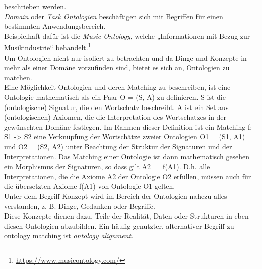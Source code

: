 beschrieben werden.\\
\textit{Domain} oder \textit{Task Ontologien} beschäftigen sich mit Begriffen
für einen bestimmten Anwendungsbereich. \cite{Bie02}  \cite{Hes02}\\
Beispielhaft dafür ist die \textit{Music Ontology}, welche „Informationen mit
Bezug zur Musikindustrie“
behandelt.\footnote{\url{https://www.musicontology.com/}}\\
Um Ontologien nicht nur isoliert zu betrachten und da Dinge und
Konzepte in mehr als einer Domäne vorzufinden sind, bietet es sich an,
Ontologien zu matchen.\\
Eine Möglichkeit Ontologien und deren Matching zu beschreiben, ist eine
Ontologie mathematisch als ein Paar O = (S, A) zu
definieren. S ist die (ontologische) Signatur, die den Wortschatz
beschreibt. A ist ein Set aus (ontologischen) Axiomen, die die Interpretation
des Wortschatzes in der gewünschten Domäne festlegen. Im Rahmen dieser Definition
ist ein Matching f: S1 -> S2 eine Verknüpfung der Wortschätze
zweier Ontologien O1 = (S1, A1) und O2 = (S2, A2)  unter Beachtung der Struktur
der Signaturen und der Interpretationen. Das Matching einer Ontologie ist dann
mathematisch gesehen ein Morphismus der Signaturen, so dass gilt A2 |= f(A1).
D.h. alle Interpretationen, die die Axiome A2 der Ontologie O2 erfüllen, müssen
auch für die übersetzten Axiome f(A1) von Ontologie O1 gelten. \cite{Hoo14}\\
Unter dem Begriff Konzept wird im Bereich der Ontologien nahezu alles
verstanden, z. B. Dinge, Gedanken oder Begriffe. \cite{Usc95}\\
Diese Konzepte
dienen dazu, Teile der Realität, Daten oder Strukturen in eben diesen Ontologien
abzubilden. Ein häufig genutzter, alternativer Begriff zu ontology
matching ist \textit{ontology alignment}.

